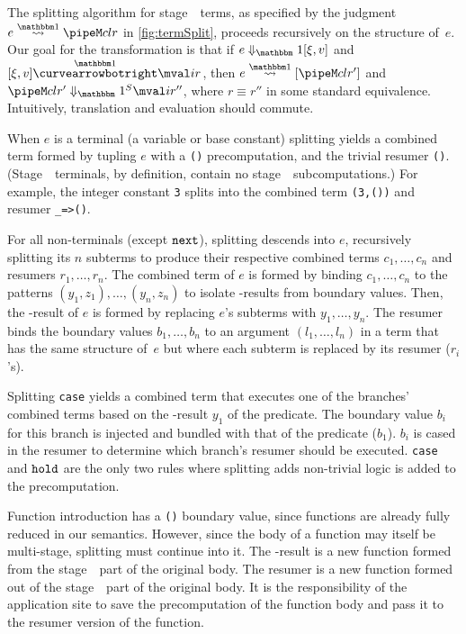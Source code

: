 \begin{abstrsyn}
The splitting algorithm for stage~\bbone\ terms, as specified by the
judgment $e \splitonesym \pipeM c l r$ in \cref{fig:termSplit}, proceeds
recursively on the structure of~$e$.
Our goal for the transformation is that 
if $\diaone e {\xi,v}$ and $[\xi,v] \vsplito \mval i r$, 
then $\splitone e A {\pipeM c l {r'}}$ and $\sepredone {\pipeM c l {r'}} {\mval i {r''}}$,
where $r \equiv r''$ in some standard equivalence.
Intuitively, translation and evaluation should commute.

When $e$ is a terminal (a variable or base constant)
splitting yields a combined term formed by tupling $e$ with a \texttt{()} precomputation, and the trivial resumer \texttt{()}. (Stage~\bbone\ terminals, by definition, contain no stage~\bbtwo\ subcomputations.)  For example, the integer constant \texttt{3} splits into the combined term \texttt{(3,())} and resumer \texttt{\_=>()}.

For all non-terminals (except ${\tt next}$),
splitting descends into $e$, recursively splitting its $n$ subterms
to produce their respective combined terms $c_1,\ldots,c_n$ and resumers $r_1, \ldots, r_n$.
The combined term of $e$ is formed by binding $c_1,\ldots,c_n$
to the patterns $(y_1,z_1),\ldots,(y_n,z_n)$
to isolate \bbone-results from boundary values. Then,
the \bbone-result of $e$ is formed by replacing $e$'s subterms with $y_1,\ldots,y_n$.
The resumer binds the boundary values $b_1,\ldots,b_n$ to an
argument $(l_1,\ldots,l_n)$ in a term that has the same structure
of~$e$ but where each subterm is replaced by its resumer ($r_i$'s).

Splitting {\tt case} yields a combined term that executes one of the branches' combined terms based on the \bbone-result $y_1$ of the predicate.
The boundary value $b_i$ for this branch is injected and bundled with that of the predicate ($b_1$).   
$b_i$ is cased in the resumer to determine which branch's resumer should be executed.
{\tt case} and ${\tt hold}$ are the only two rules where splitting adds non-trivial logic is added to the precomputation.

Function introduction has a \texttt{()} boundary value,
since functions are already fully reduced in our semantics.
However, since the body of a function may itself be multi-stage, splitting must continue into it.
The \bbone-result is a new function formed from the stage~\bbone\ part of the original body.
The resumer is a new function formed out of the stage~\bbtwo\ part of the original body.
It is the responsibility of the application site to save the precomputation of the function body
and pass it to the resumer version of the function.


\end{abstrsyn}
